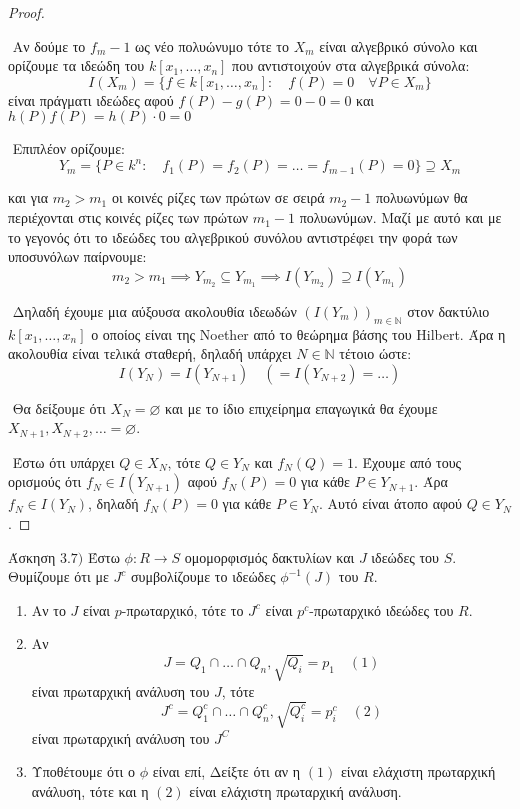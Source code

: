 \documentclass[oneside,a4paper]{article}
\newcommand {\tl}{\textlatin}
\begin{document}
\begin{proof} $ $
	
	$ $\newline 
	Αν δούμε το $f_m -1$ ως νέο πολυώνυμο τότε το $X_m$ είναι αλγεβρικό σύνολο και ορίζουμε τα ιδεώδη του $k[x_1,\ldots,x_n]$ που αντιστοιχούν στα αλγεβρικά σύνολα:
	$$I(X_m) = \{ f \in k[x_1, \ldots , x_n]: \quad f(P) = 0 \quad \forall P \in X_m\}$$
	είναι πράγματι ιδεώδες αφού $f(P) - g(P) = 0-0 = 0$ και $h(P)f(P) = h(P)\cdot 0 = 0$

	$ $\newline
	Επιπλέον ορίζουμε:
	$$Y_m = \{ P \in k^n: \quad f_1(P) = f_2 (P) = \ldots = f_{m-1}(P) = 0 \} \supseteq X_m $$
	
	και για $m_2 > m_1$ οι κοινές ρίζες των πρώτων σε σειρά $m_2-1$ πολυωνύμων θα περιέχονται στις κοινές ρίζες των πρώτων $m_1-1$ πολυωνύμων. Μαζί με αυτό και με το γεγονός ότι το ιδεώδες του αλγεβρικού συνόλου αντιστρέφει την φορά των υποσυνόλων παίρνουμε:
	$$ m_2 > m_1 \implies Y_{m_2} \subseteq Y_{m_1} \implies I(Y_{m_2}) \supseteq I(Y_{m_1}) $$
	
	$ $\newline
	Δηλαδή έχουμε μια αύξουσα ακολουθία ιδεωδών $(I(Y_m))_{m \in \mathbb{N}}$ στον δακτύλιο $k[x_1,\ldots,x_n]$ ο οποίος είναι της \tl{Noether} από το θεώρημα βάσης του \tl{Hilbert}. Άρα η ακολουθία είναι τελικά σταθερή, δηλαδή υπάρχει $N \in \mathbb{N}$ τέτοιο ώστε:
	$$I(Y_{N}) = I(Y_{N+1}) \quad \left( = I(Y_{N+2}) = \ldots \right)$$

	$ $\newline
	Θα δείξουμε ότι $X_N = \varnothing$ και με το ίδιο επιχείρημα επαγωγικά θα έχουμε $X_{N+1}, X_{N+2}, \ldots = \varnothing$.

	$ $\newline
	Έστω ότι υπάρχει $Q \in X_N$, τότε $Q \in Y_N$ και $f_N (Q) = 1$. Έχουμε από τους ορισμούς ότι $f_N \in I(Y_{N+1})$ αφού $f_N(P) = 0$ για κάθε $P \in Y_{N+1}$. Άρα $f_N \in I(Y_N)$, δηλαδή $f_N(P) = 0$ για κάθε $P \in Y_N$. Αυτό είναι άτοπο αφού $Q \in Y_N$.
\end{proof}

\pagebreak



\noindent Άσκηση $3.7)$
\quad Έστω $\phi: R \rightarrow S$ ομομορφισμός δακτυλίων και $J$ ιδεώδες του $S$. Θυμίζουμε ότι με $J^c$ συμβολίζουμε το ιδεώδες $\phi^{-1}(J)$ του $R$.
\begin{enumerate}
	\item Αν το $J$ είναι $p$-πρωταρχικό, τότε το $J^c$ είναι $p^c$-πρωταρχικό ιδεώδες του $R$.
	\item Αν 
	$$J = Q_1 \cap \ldots \cap Q_n, \sqrt{Q_i} = p_1 \quad (1)$$
	είναι πρωταρχική ανάλυση του $J$, τότε
	$$J^c = Q^c_1 \cap \ldots \cap Q^c_n, \sqrt{Q^c_i} = p^c_i \quad (2)$$
	είναι πρωταρχική ανάλυση του $J^C$

	\item Υποθέτουμε ότι ο $\phi$ είναι επί, Δείξτε ότι αν η $(1)$ είναι ελάχιστη πρωταρχική ανάλυση, τότε και η $(2)$ είναι ελάχιστη πρωταρχική ανάλυση.
\end{enumerate} 
\end{document}
